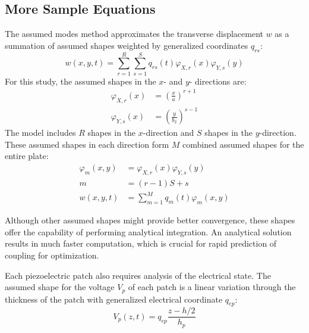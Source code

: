 \documentclass{article}
\begin{document}
\begin{body}
\begin{appendices}
{\section{More Sample Equations}
The assumed modes method approximates the transverse displacement $w$ as a summation of assumed shapes weighted by generalized coordinates $q_{rs}$:
\begin{equation}
w(x,y,t)=\sum_{r=1}^R \sum_{s=1}^S q_{rs}(t) \varphi_{X,r}(x) \varphi_{Y,s}(y)
\end{equation}
For this study, the assumed shapes in the $x$- and $y$- directions are:
\begin{align}
\varphi_{X,r}(x) &=\left(\frac{x}{a}\right)^{r+1} \\
\varphi_{Y,s}(x) &=\left(\frac{y}{b_2}\right)^{s-1}
\end{align}
The model includes $R$ shapes in the $x$-direction and $S$ shapes in the $y$-direction. These assumed shapes in each direction form $M$ combined assumed shapes for the entire plate:
\begin{align}
\varphi_m(x,y)&=\varphi_{X,r}(x) \varphi_{Y,s}(y) \\
m&=(r-1)S+s \label{meq} \\
w(x,y,t)&=\sum_{m=1}^M q_{m}(t) \varphi_{m}(x,y)
\end{align}



Although other assumed shapes might provide better convergence, these shapes offer the capability of performing analytical integration. An analytical solution results in much faster computation, which is crucial for rapid prediction of coupling for optimization. 

Each piezoelectric patch also requires analysis of the electrical state. The assumed shape for the voltage $V_p$ of each patch is a linear variation through the thickness of the patch with generalized electrical coordinate $q_{ep}$:
\begin{equation}
V_p(z,t) = q_{ep} \frac{z-h/2}{h_p}
\end{equation}


}
\end{appendices}
\end{body}
\end{document}
